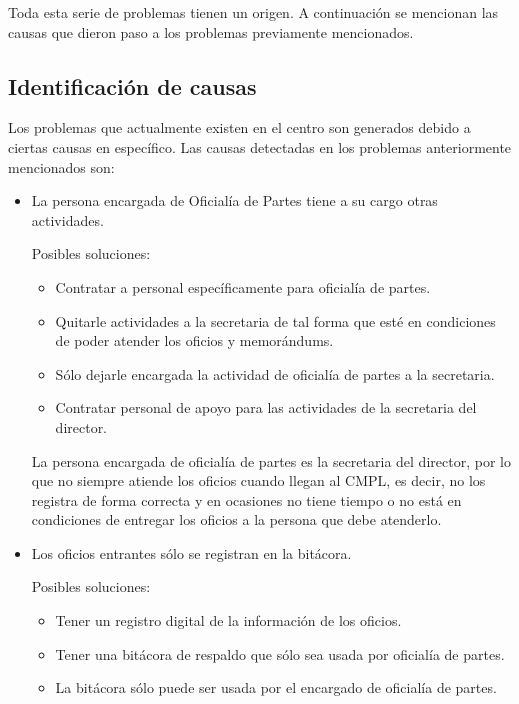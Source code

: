 Toda esta serie de problemas tienen un origen. A continuación se mencionan las causas que dieron paso a los problemas previamente mencionados.
	\subsection{Identificación de causas}
	Los problemas que actualmente existen en el centro son generados debido a ciertas causas en específico. Las causas detectadas en los problemas anteriormente mencionados son:

\begin{itemize}
	
	\item La persona encargada de Oficialía de Partes tiene a su cargo otras actividades.
	
	Posibles soluciones:
	\begin{itemize}
		\item Contratar a personal específicamente para oficialía de partes.
		\item Quitarle actividades a la secretaria de tal forma que esté en condiciones de poder atender los oficios y memorándums.
		\item Sólo dejarle encargada la actividad de oficialía de partes a la secretaria.
		\item Contratar personal de apoyo para las actividades de la secretaria del director.
	\end{itemize}
	
La persona encargada de oficialía de partes es la secretaria del director, por lo que no siempre atiende los oficios cuando llegan al CMPL, es decir, no los registra de forma correcta y en ocasiones no tiene tiempo o no está en condiciones de entregar los oficios a la persona que debe atenderlo.


	\item Los oficios entrantes sólo se registran en la bitácora.
	
	Posibles soluciones:
	\begin{itemize}
		\item Tener un registro digital de la información de los oficios.
		\item Tener una bitácora de respaldo que sólo sea usada por oficialía de partes.
		\item La bitácora sólo puede ser usada por el encargado de oficialía de partes.
	\end{itemize}	
	

\end{itemize}
